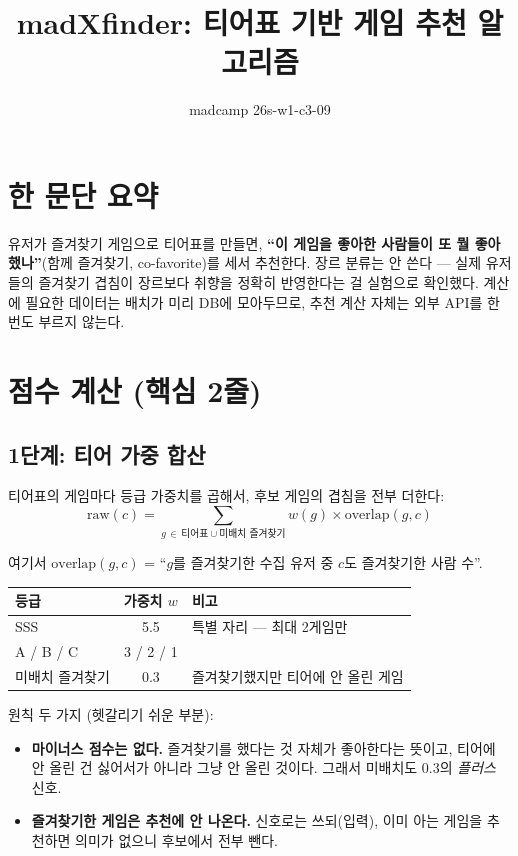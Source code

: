\documentclass[11pt]{article}
\title{madXfinder: 티어표 기반 게임 추천 알고리즘}
\author{madcamp 26s-w1-c3-09}
\date{}
\begin{document}
\maketitle

\section{한 문단 요약}

유저가 즐겨찾기 게임으로 티어표를 만들면, \textbf{``이 게임을 좋아한 사람들이 또 뭘
좋아했나''}(함께 즐겨찾기, co-favorite)를 세서 추천한다. 장르 분류는 안 쓴다 ---
실제 유저들의 즐겨찾기 겹침이 장르보다 취향을 정확히 반영한다는 걸 실험으로 확인했다.
계산에 필요한 데이터는 배치가 미리 DB에 모아두므로, 추천 계산 자체는 외부 API를
한 번도 부르지 않는다.

\section{점수 계산 (핵심 2줄)}

\subsection{1단계: 티어 가중 합산}

티어표의 게임마다 등급 가중치를 곱해서, 후보 게임의 겹침을 전부 더한다:
\begin{equation}
  \mathrm{raw}(c) = \sum_{g\,\in\,\text{티어표}\cup\text{미배치 즐겨찾기}} w(g)\times\mathrm{overlap}(g,c)
\end{equation}

여기서 $\mathrm{overlap}(g,c)$ = ``$g$를 즐겨찾기한 수집 유저 중 $c$도 즐겨찾기한 사람 수''.

\begin{center}
\begin{tabular}{lcl}
\toprule
등급 & 가중치 $w$ & 비고 \\
\midrule
SSS & 5.5 & 특별 자리 --- 최대 2게임만 \\
A / B / C & 3 / 2 / 1 & \\
미배치 즐겨찾기 & 0.3 & 즐겨찾기했지만 티어에 안 올린 게임 \\
\bottomrule
\end{tabular}
\end{center}

원칙 두 가지 (헷갈리기 쉬운 부분):
\begin{itemize}
  \item \textbf{마이너스 점수는 없다.} 즐겨찾기를 했다는 것 자체가 좋아한다는 뜻이고,
        티어에 안 올린 건 싫어서가 아니라 그냥 안 올린 것이다. 그래서 미배치도 0.3의
        \emph{플러스} 신호.
  \item \textbf{즐겨찾기한 게임은 추천에 안 나온다.} 신호로는 쓰되(입력),
        이미 아는 게임을 추천하면 의미가 없으니 후보에서 전부 뺀다.
\end{itemize}
\end{document}
